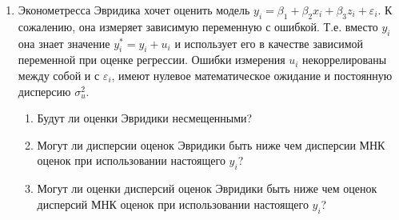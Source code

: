 \documentclass[12pt,a4paper]{article}
\newcommand{\e}{\varepsilon}
\begin{document}
\begin{enumerate}
\item Эконометресса Эвридика хочет оценить модель $y_i=\beta_1 + \beta_2 x_i +\beta_3 z_i + \e_i$. К сожалению, она измеряет зависимую переменную с ошибкой. Т.е. вместо $y_i$ она знает значение $y_i^*=y_i+u_i$ и использует его в качестве зависимой переменной при оценке регрессии. Ошибки измерения $u_i$ некоррелированы между собой и с $\e_i$, имеют нулевое математическое ожидание и постоянную дисперсию $\sigma^2_u$.
\begin{enumerate}
\item Будут ли оценки Эвридики несмещенными?
\item Могут ли дисперсии оценок Эвридики быть ниже чем дисперсии МНК оценок при использовании настоящего $y_i$?
\item Могут ли оценки дисперсий оценок Эвридики быть ниже чем оценок дисперсий МНК оценок при использовании настоящего $y_i$?
\end{enumerate}


\end{enumerate}
\end{document}
